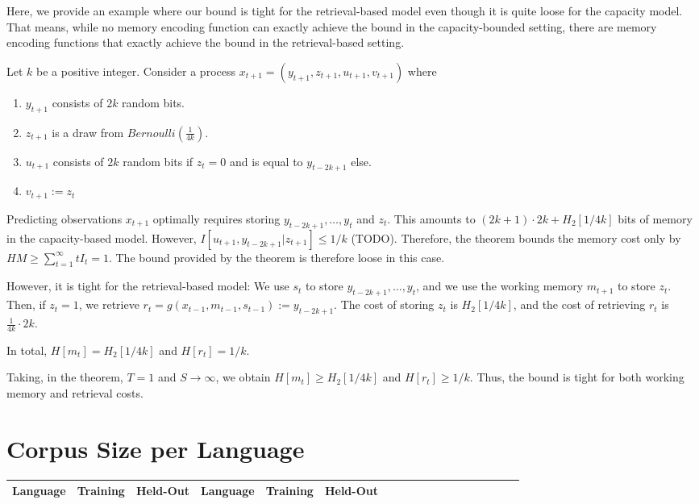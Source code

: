 \documentclass[11pt,letterpaper]{article}
\newcounter{theorem}
\begin{document}
Here, we provide an example where our bound is tight for the retrieval-based model even though it is quite loose for the capacity model.
That means, while no memory encoding function can exactly achieve the bound in the capacity-bounded setting, there are memory encoding functions that exactly achieve the bound in the retrieval-based setting.

Let $k$ be a positive integer.
Consider a process $x_{t+1} = (y_{t+1}, z_{t+1}, u_{t+1}, v_{t+1})$ where
\begin{enumerate}
    \item $y_{t+1}$ consists of $2k$ random bits.
    \item $z_{t+1}$ is a draw from $Bernoulli(\frac{1}{4k})$.
    \item $u_{t+1}$ consists of $2k$ random bits if $z_t = 0$ and is equal to $y_{t-2k+1}$ else.
    \item $v_{t+1} := z_t$ 
\end{enumerate}
Predicting observations $x_{t+1}$ optimally requires storing $y_{t-2k+1}, \dots, y_{t}$ and $z_t$.
This amounts to $(2k+1)\cdot 2k + H_2[1/4k]$ bits of memory in the capacity-based model.
However, $I[u_{t+1}, y_{t-2k+1}|z_{t+1}] \leq 1/k$ (TODO).
Therefore, the theorem bounds the memory cost only by $HM \geq \sum_{t=1}^\infty t I_t = 1$.
The bound provided by the theorem is therefore loose in this case.

However, it is tight for the retrieval-based model:
We use $s_t$ to store $y_{t-2k+1}, \dots, y_{t}$, and we use the working memory $m_{t+1}$ to store $z_t$.
Then, if $z_t = 1$, we retrieve $r_t = g(x_{t-1}, m_{t-1}, s_{t-1}) := y_{t-2k+1}$.
The cost of storing $z_t$ is $H_2[1/4k]$, and the cost of retrieving $r_t$ is $\frac{1}{4k} \cdot 2k$.



In total, $H[m_t] = H_2[1/4k]$ and $H[r_t] = 1/k$.

Taking, in the theorem, $T=1$ and $S\rightarrow\infty$, we obtain $H[m_t] \geq H_2[1/4k]$ and $H[r_t] \geq 1/k$.
Thus, the bound is tight for both working memory and retrieval costs.


\section{Corpus Size per Language}

\begin{center}
\begin{longtable}{l|ll||l|llllllllllllll}
	Language & Training & Held-Out & 	Language & Training & Held-Out\\ \hline

\end{longtable}
	\label{tab:corpora}
\end{center}
\end{document}
